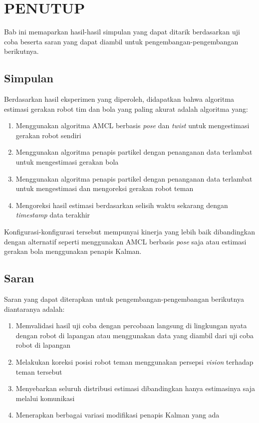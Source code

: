 \chapter{PENUTUP}

Bab ini memaparkan hasil-hasil simpulan yang dapat ditarik berdasarkan uji coba beserta saran yang dapat diambil untuk pengembangan-pengembangan berikutnya.

\section{Simpulan}

Berdasarkan hasil eksperimen yang diperoleh, didapatkan bahwa algoritma estimasi gerakan robot tim dan bola yang paling akurat adalah algoritma yang:
\begin{enumerate}
    \item Menggunakan algoritma AMCL berbasis \textit{pose} dan \textit{twist} untuk mengestimasi gerakan robot sendiri
    \item Menggunakan algoritma penapis partikel dengan penanganan data terlambat untuk mengestimasi gerakan bola
    \item Menggunakan algoritma penapis partikel dengan penanganan data terlambat untuk mengestimasi dan mengoreksi gerakan robot teman
    \item Mengoreksi hasil estimasi berdasarkan selisih waktu sekarang dengan \textit{timestamp} data terakhir
\end{enumerate}

Konfigurasi-konfigurasi tersebut mempunyai kinerja yang lebih baik dibandingkan dengan alternatif seperti menggunakan AMCL berbasis \textit{pose} saja atau estimasi gerakan bola menggunakan penapis Kalman.

\section{Saran}

Saran yang dapat diterapkan untuk pengembangan-pengembangan berikutnya diantaranya adalah:
\begin{enumerate}
    \item Memvalidasi hasil uji coba dengan percobaan langsung di lingkungan nyata dengan robot di lapangan atau menggunakan data yang diambil dari uji coba robot di lapangan
    \item Melakukan koreksi posisi robot teman menggunakan persepsi \textit{vision} terhadap teman tersebut
    \item Menyebarkan seluruh distribusi estimasi dibandingkan hanya estimasinya saja melalui komunikasi
    \item Menerapkan berbagai variasi modifikasi penapis Kalman yang ada
\end{enumerate}
